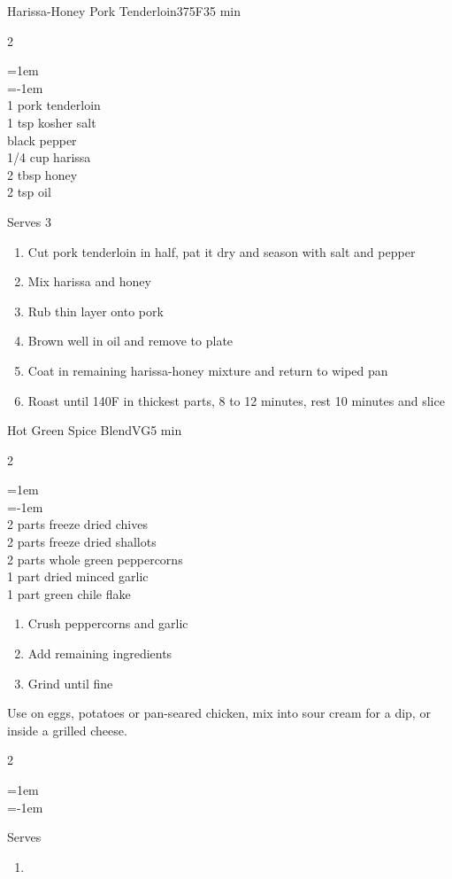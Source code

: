 \documentclass{article}
\newenvironment{recipe}[3][]
    {\begin{cardbase}[#1]{#2}{#3}
    \columnratio{0.333}
    \begin{paracol}{2}}
    {\end{paracol}\end{cardbase}}
\newcommand{\nextcolumn}{\switchcolumn}
\newenvironment{ingredients}
    {
    \begin{obeylines}
    \vspace{\parskip}
    \setlength{\parskip}{0.25em}
    \vspace{-0.25em}
    \leftskip=1em
    \parindent=-1em}
    {\end{obeylines}}
\newenvironment{steps}
    {\begin{enumerate}[leftmargin=*,topsep=0pt]}
    {\end{enumerate}}
\newcommand{\fahrenheit}[1]{#1\textdegree{}F}
\newcommand{\tag}[1]{\hspace{1em}#1}
\newcommand{\symboltag}[2]{\tag{#1\hspace{0.4em}#2}}
\newcommand{\totaltime}[1]{\symboltag{\raisebox{-0.1em}{\small\StopWatchEnd}}{#1}}
\newcommand{\preheat}[1]{\symboltag{\Topbottomheat}{#1}}
\begin{document}
\begin{recipe}{Harissa-Honey Pork Tenderloin}{\preheat{\fahrenheit{375}}\totaltime{35 min}}
\begin{ingredients}
1 pork tenderloin
1 tsp kosher salt
black pepper
1/4 cup harissa
2 tbsp honey
2 tsp oil
\end{ingredients}
\nextcolumn
Serves 3
\begin{steps}
    \item Cut pork tenderloin in half, pat it dry and season with salt and pepper
    \item Mix harissa and honey
    \item Rub thin layer onto pork
    \item Brown well in oil and remove to plate
    \item Coat in remaining harissa-honey mixture and return to wiped pan
    \item Roast until \fahrenheit{140} in thickest parts, 8 to 12 minutes, rest 10 minutes and slice
\end{steps}
\end{recipe}

\begin{recipe}{Hot Green Spice Blend}{\tag{VG}\totaltime{5 min}}
\begin{ingredients}
2 parts freeze dried chives
2 parts freeze dried shallots
2 parts whole green peppercorns
1 part dried minced garlic
1 part green chile flake
\end{ingredients}
\nextcolumn
\begin{steps}
    \item Crush peppercorns and garlic
    \item Add remaining ingredients
    \item Grind until fine
\end{steps}
Use on eggs, potatoes or pan-seared chicken, mix into sour cream for a dip, or inside a grilled cheese.
\end{recipe}

\iffalse

\begin{recipe}{}{\tag{}\preheat{}\totaltime{}}
\begin{ingredients}
\end{ingredients}
\nextcolumn
Serves
\begin{steps}
    \item
\end{steps}
\end{recipe}
\end{document}
